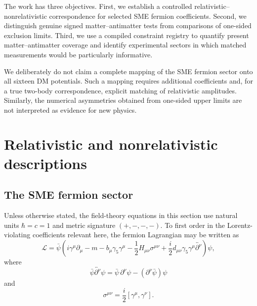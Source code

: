 \documentclass[aps,prd,reprint,superscriptaddress,nofootinbib]{revtex4-2}
\begin{document}
	The work has three objectives. First, we establish a controlled
	relativistic--nonrelativistic correspondence for selected SME fermion
	coefficients. Second, we distinguish genuine signed matter--antimatter
	tests from comparisons of one-sided exclusion limits. Third, we use a
	compiled constraint registry to quantify present matter--antimatter
	coverage and identify experimental sectors in which matched
	measurements would be particularly informative.
	
	We deliberately do not claim a complete mapping of the SME fermion
	sector onto all sixteen DM potentials. Such a mapping requires additional
	coefficients and, for a true two-body correspondence, explicit matching
	of relativistic amplitudes. Similarly, the numerical asymmetries
	obtained from one-sided upper limits are not interpreted as evidence for
	new physics.
	
	\section{Relativistic and nonrelativistic descriptions}
	
	\subsection{The SME fermion sector}
	
	Unless otherwise stated, the field-theory equations in this section use
	natural units $\hbar=c=1$ and metric signature $(+,-,-,-)$. To first
	order in the Lorentz-violating coefficients relevant here, the fermion
	Lagrangian may be written as
	\begin{equation}
		\mathcal{L}
		=
		\bar\psi
		\left(
		i\gamma^\mu\partial_\mu-m
		-b_\mu\gamma_5\gamma^\mu
		-\frac{1}{2}H_{\mu\nu}\sigma^{\mu\nu}
		+\frac{i}{2}d_{\mu\nu}
		\gamma_5\gamma^\mu
		\overleftrightarrow{\partial^\nu}
		\right)\psi ,
		\label{eq:SMEL}
	\end{equation}
	where
	\begin{equation}
		\bar\psi\overleftrightarrow{\partial^\nu}\psi
		=
		\bar\psi\,\partial^\nu\psi
		-
		(\partial^\nu\bar\psi)\psi
	\end{equation}
	and
	\begin{equation}
		\sigma^{\mu\nu}
		=
		\frac{i}{2}[\gamma^\mu,\gamma^\nu].
	\end{equation}
	
\end{document}
